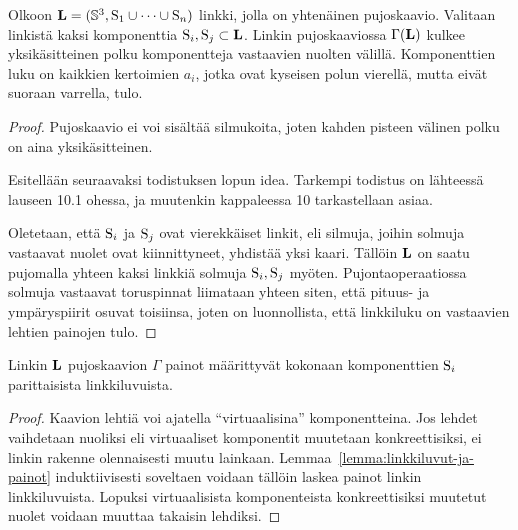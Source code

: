 \begin{lemma}
    \label{lemma:linkkiluvut-ja-painot}
    Olkoon $\mathbf{L}=(\mathbb{S}^3,\text{S}_1\cup\cdots\cup\text{S}_n)$ linkki, jolla on yhtenäinen pujoskaavio. Valitaan linkistä kaksi komponenttia $\text{S}_i,\text{S}_j\subset\mathbf{L}$. Linkin pujoskaaviossa $\Gamma(\mathbf{L})$ kulkee yksikäsitteinen polku komponentteja vastaavien nuolten välillä. Komponenttien luku on kaikkien kertoimien $a_i$, jotka ovat kyseisen polun vierellä, mutta eivät suoraan varrella, tulo.
\end{lemma}
\begin{proof}
    Pujoskaavio ei voi sisältää silmukoita, joten kahden pisteen välinen polku on aina yksikäsitteinen.

    Esitellään seuraavaksi todistuksen lopun idea. Tarkempi todistus on lähteessä~\citep{EN1985} lauseen 10.1 ohessa, ja muutenkin kappaleessa 10 tarkastellaan asiaa.

    Oletetaan, että $\text{S}_i$ ja $\text{S}_j$ ovat vierekkäiset linkit, eli silmuja, joihin solmuja vastaavat nuolet ovat kiinnittyneet, yhdistää yksi kaari. Tällöin $\mathbf{L}$ on saatu pujomalla yhteen kaksi linkkiä solmuja $\text{S}_i,\text{S}_j$ myöten. Pujontaoperaatiossa solmuja vastaavat toruspinnat liimataan yhteen siten, että pituus- ja ympäryspiirit osuvat toisiinsa, joten on luonnollista, että linkkiluku on vastaavien lehtien painojen tulo.
\end{proof}
\begin{seuraus}
    \label{seuraus:painot-määrittyvät-linkkiluvuista}
    Linkin $\mathbf{L}$ pujoskaavion $\Gamma$ painot määrittyvät kokonaan komponenttien $\text{S}_i$ parittaisista linkkiluvuista.
\end{seuraus}
\begin{proof}
    Kaavion lehtiä voi ajatella ``virtuaalisina'' komponentteina. Jos lehdet vaihdetaan nuoliksi eli virtuaaliset komponentit muutetaan konkreettisiksi, ei linkin rakenne olennaisesti muutu lainkaan. Lemmaa~\ref{lemma:linkkiluvut-ja-painot} induktiivisesti soveltaen voidaan tällöin laskea painot linkin linkkiluvuista. Lopuksi virtuaalisista komponenteista konkreettisiksi muutetut nuolet voidaan muuttaa takaisin lehdiksi.
\end{proof}
